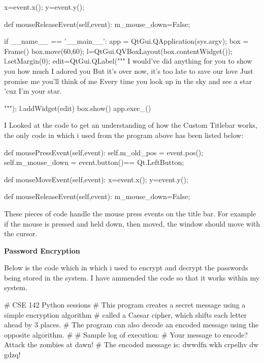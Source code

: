 \begin{python}
\begin{python}
        x=event.x();
        y=event.y();

    def mouseReleaseEvent(self,event):
        m_mouse_down=False;




if __name__ == '__main__':
    app = QtGui.QApplication(sys.argv);
    box = Frame()
    box.move(60,60);
    l=QtGui.QVBoxLayout(box.contentWidget());
    l.setMargin(0);
    edit=QtGui.QLabel("""
I would've did anything for you to show you how much I adored you
But it's over now, it's too late to save our love
Just promise me you'll think of me
Every time you look up in the sky and see a star 'cuz I'm  your star.

                          """);
    l.addWidget(edit)
    box.show()
    app.exec_()

\end{python}


I Looked at the code to get an understanding of how the Custom Titlebar works, the only code in which i used from the program above has been listed below:

\begin{python}

def mousePressEvent(self,event):
        self.m_old_pos = event.pos();
        self.m_mouse_down = event.button()== Qt.LeftButton;
   
def mouseMoveEvent(self,event):
        x=event.x();
        y=event.y();
        
def mouseReleaseEvent(self,event):
        m_mouse_down=False;

\end{python}

These pieces of code handle the mouse press events on the title bar. For example if the mouse is pressed and held down, then moved, the window should move with the cursor.

\textbf{Password Encryption}

Below is the code which in which i used to encrypt and decrypt the passwords being stored in the system. I have ammended the code so that it works within my system.

\begin{python}
# CSE 142 Python sessions
# This program creates a secret message using a simple encryption algorithm
# called a Caesar cipher, which shifts each letter ahead by 3 places.
# The program can also decode an encoded message using the opposite algorithm.
#
# Sample log of execution:
# Your message to encode? Attack the zombies at dawn!
# The encoded message is: dwwdfn wkh crpelhv dw gdzq!


\end{python}
\end{python}
